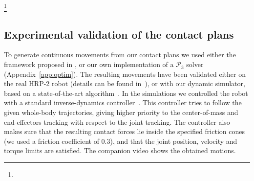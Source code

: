 \documentclass[journal]{IEEEtran}
\newcommand{\commentt}[2]{\textcolor{#1}{\textbf{\textit{[#2]}}}} 	%
\newcommand{\adnote}[1]{\commentt{blue}{AD: #1}}
\newcommand{\gls}[1]{\textit{#1}}
\providecommand{\DIFaddtex}[1]{#1} %
\providecommand{\DIFdeltex}[1]{} %
\providecommand{\DIFaddbegin}{\protect\color{blue}} %
\providecommand{\DIFaddend}{\protect\color{black}} %
\providecommand{\DIFdelbegin}{\protect\cbdelete} %
\providecommand{\DIFdelend}{} %
\providecommand{\DIFadd}[1]{\texorpdfstring{\DIFaddtex{#1}}{#1}} %
\providecommand{\DIFdel}[1]{\texorpdfstring{\DIFdeltex{#1}}{}} %
\begin{document}
\DIFdelbegin \DIFdel{These scenarios complement the ones demonstrated on virtual avatars (Figure~\ref{fig:robots_old})in our previous ISRR paper~\citep{tonneauisrr15} and video}\footnote{%
}%
\addtocounter{footnote}{-1}%
\DIFdel{.
}\DIFdelend \DIFaddbegin \subsection{\DIFadd{Experimental validation of the contact plans}} \label{sec:valid}
\DIFadd{To generate continuous movements from our contact plans we used either the framework proposed in \cite{Carpentier2016}, or our own implementation of a $\mathcal{P}_3$ solver (Appendix~\ref{app:optim}).
The resulting movements have been validated either on the real HRP-2 robot (details can be found in~\cite{Carpentier2016}), or with our dynamic simulator, based on a state-of-the-art algorithm~\cite{Kaufman2008}.
In the simulations we controlled the robot with a standard inverse-dynamics controller~\cite{DelPrete2015b}.
This controller tries to follow the given whole-body trajectories, giving higher priority to the center-of-mass and end-effectors tracking with respect to the joint tracking.
The controller also makes sure that the resulting contact forces lie inside the specified friction cones (we used a friction coefficient of 0.3), and that the joint position, velocity and torque limits are satisfied.
The companion video shows the obtained motions.
}

\DIFaddend %

\end{document}
